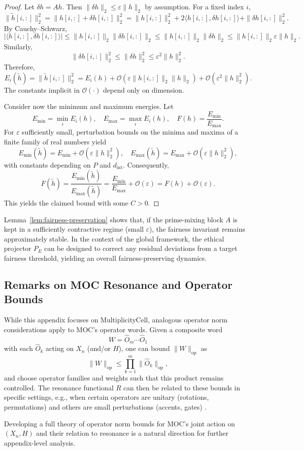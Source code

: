 \documentclass[11pt]{article}
\begin{document}
\begin{proof}
Let \(\delta h = A h\). Then \(\|\delta h\|_2 \le \varepsilon \|h\|_2\) by
assumption. For a fixed index \(i\),
\[
  \|\tilde h[i,:]\|_2^2
  =
  \|h[i,:] + \delta h[i,:]\|_2^2
  =
  \|h[i,:]\|_2^2
  + 2 \langle h[i,:], \delta h[i,:]\rangle
  + \|\delta h[i,:]\|_2^2.
\]
By Cauchy--Schwarz,
\[
  |\langle h[i,:], \delta h[i,:]\rangle|
  \le
  \|h[i,:]\|_2 \|\delta h[i,:]\|_2
  \le
  \|h[i,:]\|_2 \|\delta h\|_2
  \le
  \|h[i,:]\|_2 \varepsilon \|h\|_2.
\]
Similarly,
\[
  \|\delta h[i,:]\|_2^2
  \le
  \|\delta h\|_2^2
  \le
  \varepsilon^2 \|h\|_2^2.
\]
Therefore,
\[
  E_i(\tilde h)
  =
  \|\tilde h[i,:]\|_2^2
  =
  E_i(h)
  + \mathcal{O}(\varepsilon \|h[i,:]\|_2 \|h\|_2)
  + \mathcal{O}(\varepsilon^2 \|h\|_2^2).
\]
The constants implicit in \(\mathcal{O}(\cdot)\) depend only on dimension.

Consider now the minimum and maximum energies. Let
\[
  E_{\min} = \min_i E_i(h), \quad
  E_{\max} = \max_i E_i(h),
  \quad
  F(h) = \frac{E_{\min}}{E_{\max}}.
\]
For \(\varepsilon\) sufficiently small, perturbation bounds on the minima and
maxima of a finite family of real numbers yield
\[
  E_{\min}(\tilde h)
  =
  E_{\min} + \mathcal{O}(\varepsilon \|h\|_2^2), \quad
  E_{\max}(\tilde h)
  =
  E_{\max} + \mathcal{O}(\varepsilon \|h\|_2^2),
\]
with constants depending on \(P\) and \(d_{\text{int}}\). Consequently,
\[
  F(\tilde h)
  =
  \frac{E_{\min}(\tilde h)}{E_{\max}(\tilde h)}
  =
  \frac{E_{\min}}{E_{\max}}
  + \mathcal{O}(\varepsilon)
  =
  F(h) + \mathcal{O}(\varepsilon).
\]
This yields the claimed bound with some \(C>0\).
\end{proof}

Lemma~\ref{lem:fairness-preservation} shows that, if the prime-mixing block
\(A\) is kept in a sufficiently contractive regime (small \(\varepsilon\)), the
fairness invariant remains approximately stable. In the context of the global
framework, the ethical projector \(P_E\) can be designed to correct any
residual deviations from a target fairness threshold, yielding an overall
fairness-preserving dynamics.

\subsection{Remarks on MOC Resonance and Operator Bounds}

While this appendix focuses on MultiplicityCell, analogous operator norm
considerations apply to MOC's operator words. Given a composite word
\[
  W = \hat O_m \cdots \hat O_1
\]
with each \(\hat O_k\) acting on \(X_n\) (and/or \(H\)), one can bound
\(\|W\|_{\mathrm{op}}\) as
\[
  \|W\|_{\mathrm{op}}
  \le
  \prod_{k=1}^m \|\hat O_k\|_{\mathrm{op}},
\]
and choose operator families and weights such that this product remains
controlled. The resonance functional \(R\) can then be related to these bounds
in specific settings, e.g., when certain operators are unitary (rotations,
permutations) and others are small perturbations (accents, gates) \cite{MOC}.

Developing a full theory of operator norm bounds for MOC's joint action on
\((X_n,H)\) and their relation to resonance is a natural direction for further
appendix-level analysis.


\nocite{*}
  

\end{document}
